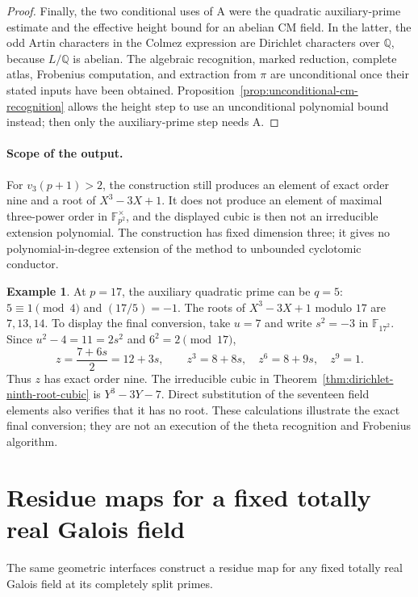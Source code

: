 \documentclass[11pt]{article}
\theoremstyle{definition}
\newtheorem{example}[theorem]{Example}
\theoremstyle{remark}
\begin{document}
\begin{proof}
Finally, the two conditional uses of \(\mathrm A\) were the
quadratic auxiliary-prime estimate and the effective height
bound for an abelian CM field. In the latter, the odd Artin
characters in the Colmez expression are Dirichlet characters over
\(\mathbb Q\), because \(L/\mathbb Q\) is abelian. The algebraic
recognition, marked reduction, complete atlas, Frobenius
computation, and extraction from \(\pi\) are unconditional
once their stated inputs have been obtained. Proposition~\ref{prop:unconditional-cm-recognition}
allows the height step to use an unconditional polynomial bound instead;
then only the auxiliary-prime step needs \(\mathrm A\).
\end{proof}

\paragraph{Scope of the output.}
For \(v_3(p+1)>2\), the construction still produces an element
of exact order nine and a root of \(X^3-3X+1\). It does not
produce an element of maximal three-power order in
\(\mathbb F_{p^2}^{\times}\), and the displayed cubic is then
not an irreducible extension polynomial. The construction has
fixed dimension three; it gives no polynomial-in-degree
extension of the method to unbounded cyclotomic conductor.


\begin{example}\label{ex:sextic-cm-seventeen}
At \(p=17\), the auxiliary quadratic prime can be \(q=5\):
\(5\equiv1\pmod4\) and \((17/5)=-1\).
The roots of \(X^3-3X+1\) modulo \(17\) are \(7,13,14\).
To display the final conversion, take \(u=7\) and write
\(s^2=-3\) in \(\mathbb F_{17^2}\). Since
\(u^2-4=11=2s^2\) and \(6^2=2\pmod{17}\),
\[
 z=\frac{7+6s}{2}=12+3s,\qquad
 z^3=8+8s,\quad z^6=8+9s,\quad z^9=1.
\]
Thus \(z\) has exact order nine. The irreducible cubic in
Theorem~\ref{thm:dirichlet-ninth-root-cubic} is
\(Y^3-3Y-7\). Direct substitution of the seventeen field elements
also verifies that it has no root. These calculations illustrate the
exact final conversion; they are not an execution of the theta
recognition and Frobenius algorithm.
\end{example}

\section{Residue maps for a fixed totally real Galois field}
\label{sec:general-real-residue}
The same geometric interfaces construct a residue map for any fixed totally real Galois field at its completely split primes.
\end{document}
